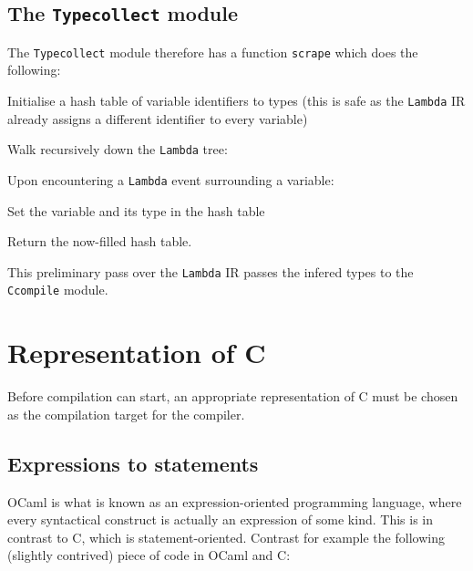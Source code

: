 \subsection{The \texttt{Typecollect} module}

The \texttt{Typecollect} module therefore has a function \texttt{scrape} which
does the following:

\begin{enumerate}

    \item Initialise a hash table of variable identifiers to types
    (this is safe as the \texttt{Lambda} IR already assigns a different 
    identifier to every variable)

    \item Walk recursively down the \texttt{Lambda} tree:

    {\setlength{\itemindent}{25pt} \item Upon encountering a \texttt{Lambda} 
    event surrounding a variable:}

    {\setlength{\itemindent}{50pt} \item Set the variable and its type in the 
    hash table}

    \item Return the now-filled hash table.

\end{enumerate}

This preliminary pass over the \texttt{Lambda} IR passes the infered types to
the \texttt{Ccompile} module.

\section{Representation of C} \label{representation-c}

Before compilation can start, an appropriate representation of C must be chosen 
as the compilation target for the compiler.

\subsection{Expressions to statements} \label{expr-stmt}

OCaml is what is known as an expression-oriented programming language, where
every syntactical construct is actually an expression of some kind. This is in
contrast to C, which is statement-oriented. Contrast for example the following
(slightly contrived) piece of code in OCaml and C:


